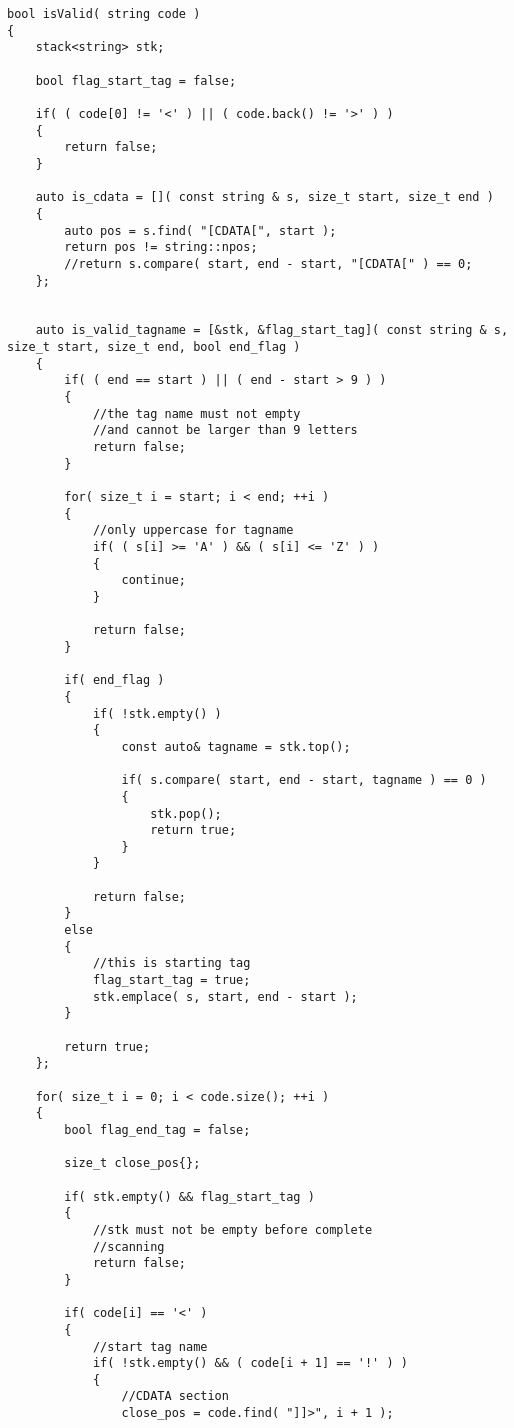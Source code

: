 \setcounter{lstlisting}{0}
\begin{lstlisting}[style=customc, caption={Stack}]
bool isValid( string code )
{
    stack<string> stk;

    bool flag_start_tag = false;

    if( ( code[0] != '<' ) || ( code.back() != '>' ) )
    {
        return false;
    }

    auto is_cdata = []( const string & s, size_t start, size_t end )
    {
        auto pos = s.find( "[CDATA[", start );
        return pos != string::npos;
        //return s.compare( start, end - start, "[CDATA[" ) == 0;
    };


    auto is_valid_tagname = [&stk, &flag_start_tag]( const string & s, size_t start, size_t end, bool end_flag )
    {
        if( ( end == start ) || ( end - start > 9 ) )
        {
            //the tag name must not empty
            //and cannot be larger than 9 letters
            return false;
        }

        for( size_t i = start; i < end; ++i )
        {
            //only uppercase for tagname
            if( ( s[i] >= 'A' ) && ( s[i] <= 'Z' ) )
            {
                continue;
            }

            return false;
        }

        if( end_flag )
        {
            if( !stk.empty() )
            {
                const auto& tagname = stk.top();

                if( s.compare( start, end - start, tagname ) == 0 )
                {
                    stk.pop();
                    return true;
                }
            }

            return false;
        }
        else
        {
            //this is starting tag
            flag_start_tag = true;
            stk.emplace( s, start, end - start );
        }

        return true;
    };

    for( size_t i = 0; i < code.size(); ++i )
    {
        bool flag_end_tag = false;

        size_t close_pos{};

        if( stk.empty() && flag_start_tag )
        {
            //stk must not be empty before complete
            //scanning
            return false;
        }

        if( code[i] == '<' )
        {
            //start tag name
            if( !stk.empty() && ( code[i + 1] == '!' ) )
            {
                //CDATA section
                close_pos = code.find( "]]>", i + 1 );


\end{lstlisting}
